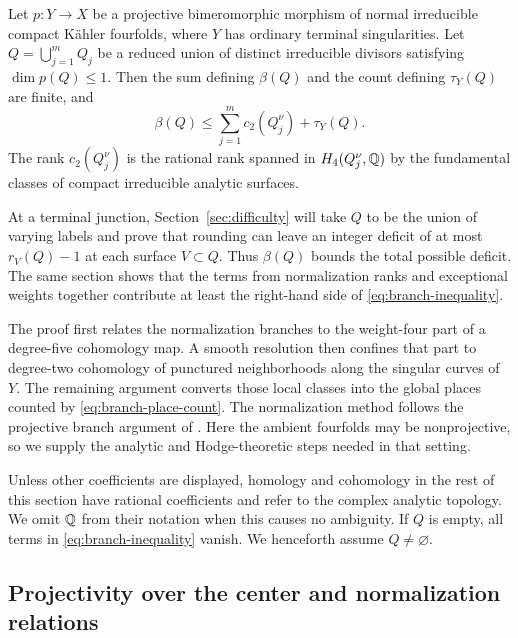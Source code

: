 \begin{theorem}\label{thm:branch}
Let $p\colon Y\to X$ be a projective bimeromorphic morphism of normal
irreducible compact K\"ahler fourfolds, where $Y$ has ordinary terminal
singularities.  Let $Q=\bigcup_{j=1}^{m}Q_j$ be a reduced union of
distinct irreducible divisors satisfying $\dim p(Q)\leq1$.  Then the
sum defining $\beta(Q)$ and the count defining $\tau_Y(Q)$ are finite,
and
\begin{equation}\label{eq:branch-inequality}
 \beta(Q)\leq\sum_{j=1}^{m}c_2(Q_j^\nu)+\tau_Y(Q).
\end{equation}
The rank $c_2(Q_j^\nu)$ is the rational rank spanned in
$H_4(Q_j^\nu,\mathbb{Q})$ by the fundamental classes of compact irreducible
analytic surfaces.
\end{theorem}

At a terminal junction, Section~\ref{sec:difficulty} will take $Q$ to
be the union of varying labels and prove that rounding can leave an
integer deficit of at most $r_V(Q)-1$ at each surface $V\subset Q$.
Thus $\beta(Q)$ bounds the total possible deficit.  The same section
shows that the terms from normalization ranks and exceptional weights
together contribute at least the right-hand side of
\eqref{eq:branch-inequality}.

The proof first relates the normalization branches to the weight-four
part of a degree-five cohomology map.  A smooth resolution then confines
that part to degree-two cohomology of punctured neighborhoods along the
singular curves of $Y$.  The remaining argument converts those local classes into the
global places counted by \eqref{eq:branch-place-count}.  The
normalization method follows the projective branch argument of
\cite[Section~5, especially Lemma~5.2]{ProjectiveLCFourfolds}.  Here the
ambient fourfolds may be nonprojective, so we supply the analytic and
Hodge-theoretic steps needed in that setting.

Unless other coefficients are displayed, homology and cohomology in
the rest of this section have rational coefficients and refer to the
complex analytic topology.  We omit $\mathbb{Q}$ from their notation when this
causes no ambiguity.  If $Q$ is empty,
all terms in \eqref{eq:branch-inequality} vanish.  We henceforth assume
$Q\ne\varnothing$.

\subsection{Projectivity over the center and normalization relations}


